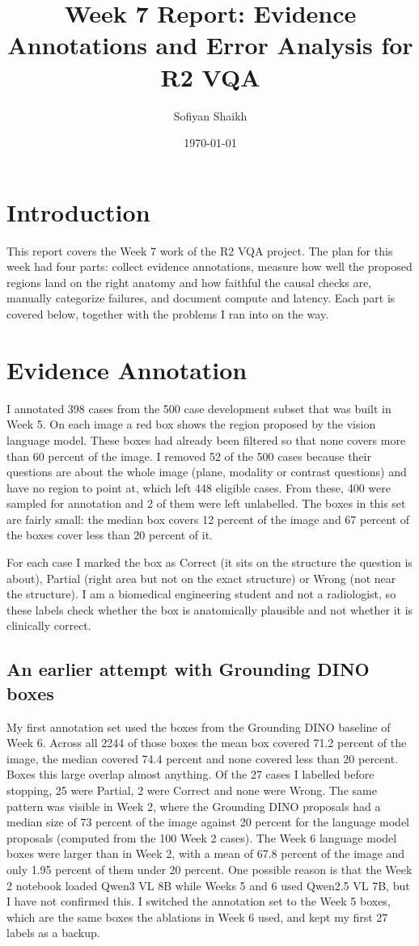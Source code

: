 \documentclass[11pt]{article}
\title{Week 7 Report: Evidence Annotations and Error Analysis for R2 VQA}
\author{Sofiyan Shaikh}
\date{\today}
\begin{document}
\maketitle

\section{Introduction}
This report covers the Week 7 work of the R2 VQA project. The plan for this week had four parts: collect evidence annotations,
measure how well the proposed regions land on the right anatomy and how faithful the causal checks are, manually categorize
failures, and document compute and latency. Each part is covered below, together with the problems I ran into on the way.

\section{Evidence Annotation}
I annotated 398 cases from the 500 case development subset that was built in Week 5. On each image a red box shows the region
proposed by the vision language model. These boxes had already been filtered so that none covers more than 60 percent of the image.
I removed 52 of the 500 cases because their questions are about the whole image (plane, modality or contrast questions) and have
no region to point at, which left 448 eligible cases. From these, 400 were sampled for annotation and 2 of them
were left unlabelled. The boxes in this set are fairly small: the median box covers 12 percent of the image and
67 percent of the boxes cover less than 20 percent of it.

For each case I marked the box as Correct (it sits on the structure the question is about), Partial (right area but not on the
exact structure) or Wrong (not near the structure). I am a biomedical engineering student and not a radiologist, so these labels
check whether the box is anatomically plausible and not whether it is clinically correct.

\subsection{An earlier attempt with Grounding DINO boxes}
My first annotation set used the boxes from the Grounding DINO baseline of Week 6. Across all 2244 of those boxes the mean box
covered 71.2 percent of the image, the median covered 74.4 percent and none covered less than 20 percent. Boxes this large overlap
almost anything. Of the 27 cases I labelled before stopping, 25 were Partial, 2 were Correct and none were Wrong. The same pattern
was visible in Week 2, where the Grounding DINO proposals had a median size of 73 percent of the image against 20 percent for the
language model proposals (computed from the 100 Week 2 cases). The Week 6 language model boxes were larger than in Week 2, with a mean
of 67.8 percent of the image and only 1.95 percent of them under 20 percent. One possible reason is that the Week 2 notebook loaded
Qwen3 VL 8B while Weeks 5 and 6 used Qwen2.5 VL 7B, but I have not confirmed this. I switched the annotation set to the Week 5 boxes, which are the
same boxes the ablations in Week 6 used, and kept my first 27 labels as a backup.
\end{document}
